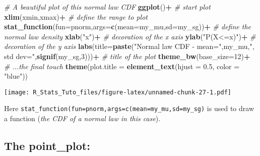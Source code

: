 \documentclass[
]{article}
\newenvironment{Shaded}{\begin{snugshade}}{\end{snugshade}}
\newcommand{\AttributeTok}[1]{\textcolor[rgb]{0.13,0.29,0.53}{#1}}
\newcommand{\CommentTok}[1]{\textcolor[rgb]{0.56,0.35,0.01}{\textit{#1}}}
\newcommand{\DecValTok}[1]{\textcolor[rgb]{0.00,0.00,0.81}{#1}}
\newcommand{\FloatTok}[1]{\textcolor[rgb]{0.00,0.00,0.81}{#1}}
\newcommand{\FunctionTok}[1]{\textcolor[rgb]{0.13,0.29,0.53}{\textbf{#1}}}
\newcommand{\NormalTok}[1]{#1}
\newcommand{\SpecialCharTok}[1]{\textcolor[rgb]{0.81,0.36,0.00}{\textbf{#1}}}
\newcommand{\StringTok}[1]{\textcolor[rgb]{0.31,0.60,0.02}{#1}}
\begin{document}
\begin{Shaded}
\begin{Highlighting}[]
\CommentTok{\# A beautiful plot of this normal law CDF}
\FunctionTok{ggplot}\NormalTok{()}\SpecialCharTok{+} \CommentTok{\# start plot}
  \FunctionTok{xlim}\NormalTok{(xmin,xmax)}\SpecialCharTok{+} \CommentTok{\# define the range to plot}
  \FunctionTok{stat\_function}\NormalTok{(}\AttributeTok{fun=}\NormalTok{pnorm,}\AttributeTok{args=}\FunctionTok{c}\NormalTok{(}\AttributeTok{mean=}\NormalTok{my\_mu,}\AttributeTok{sd=}\NormalTok{my\_sg))}\SpecialCharTok{+} \CommentTok{\# define the normal law density}
  \FunctionTok{xlab}\NormalTok{(}\StringTok{"x"}\NormalTok{)}\SpecialCharTok{+} \CommentTok{\# decoration of the x axis}
  \FunctionTok{ylab}\NormalTok{(}\StringTok{"P(X\textless{}=x)"}\NormalTok{)}\SpecialCharTok{+} \CommentTok{\# decoration of the y axis}
  \FunctionTok{labs}\NormalTok{(}\AttributeTok{title=}\FunctionTok{paste}\NormalTok{(}\StringTok{"Normal law CDF {-} mean="}\NormalTok{,my\_mu,}\StringTok{", std dev="}\NormalTok{,}\FunctionTok{signif}\NormalTok{(my\_sg,}\DecValTok{3}\NormalTok{)))}\SpecialCharTok{+} \CommentTok{\# title of the plot}
  \FunctionTok{theme\_bw}\NormalTok{(}\AttributeTok{base\_size=}\DecValTok{12}\NormalTok{)}\SpecialCharTok{+} \CommentTok{\# ...the final touch}
  \FunctionTok{theme}\NormalTok{(}\AttributeTok{plot.title =} \FunctionTok{element\_text}\NormalTok{(}\AttributeTok{hjust =} \FloatTok{0.5}\NormalTok{, }\AttributeTok{color =} \StringTok{"blue"}\NormalTok{))}
\end{Highlighting}
\end{Shaded}

\texttt{[image: R\_Stats\_Tuto\_files/figure-latex/unnamed-chunk-27-1.pdf]}

Here \texttt{stat\_function(fun=pnorm,args=c(mean=my\_mu,sd=my\_sg)} is
used to draw a function (\emph{the CDF of a normal law in this case}).

\hypertarget{the-point_plot}{%
\subsection{The point\_plot:}\label{the-point_plot}}
\end{document}
